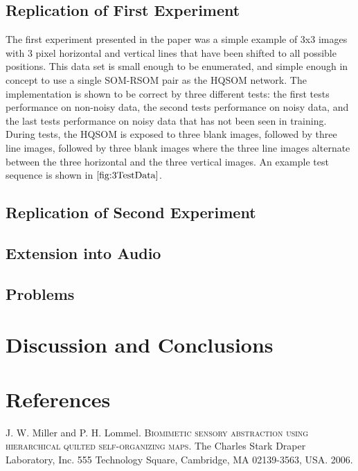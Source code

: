 \documentclass[a4paper,10pt]{article}
\begin{document}
\subsection{Replication of First Experiment}
The first experiment presented in the paper was a simple example of 3x3 images with 3
pixel horizontal and vertical lines that have been shifted to all possible positions.  This data
set is small enough to be enumerated, and simple enough in concept to use a single SOM-RSOM pair as
the HQSOM network.  The implementation is shown to be correct by three different tests: the first
tests performance on non-noisy data, the second tests performance on noisy data, and the last tests
performance on noisy data that has not been seen in training.  During tests, the HQSOM is exposed
to three blank images, followed by three line images, followed by three blank images where the
three line images alternate between the three horizontal and the three vertical images.  An example
test sequence is shown in $\ref{fig:3TestData}$.


\subsection{Replication of Second Experiment}
\subsection{Extension into Audio}
\subsection{Problems}
\section{Discussion and Conclusions}
\section{References}

\begin{thebibliography}{}
 J. W. Miller and P. H. Lommel. \textsc{Biomimetic sensory abstraction using
hierarchical quilted self-organizing maps}. The Charles Stark Draper Laboratory, Inc.
555 Technology Square, Cambridge, MA 02139-3563, USA. 2006.
\end{thebibliography}
\end{document}
